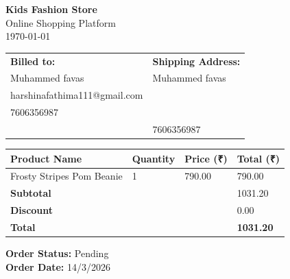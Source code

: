 \documentclass[a4paper,12pt]{article}
\begin{document}
            \begin{center}
            \textbf{\Large Kids Fashion Store}\\
            \small Online Shopping Platform\\ 
            \today
            \end{center}

            \vspace{1cm}

            \begin{tabular}{p{3cm} p{8cm}}
            \textbf{Billed to:} & \textbf{Shipping Address:} \\
            Muhammed favas & Muhammed favas \\
            harshinafathima111@gmail.com &  \\
            7606356987 &  \\
            & 7606356987 \\
            \end{tabular}

            \vspace{1cm}

            \begin{table}[h]
            \centering
            \begin{tabular}{p{4cm} p{2cm} p{2cm} p{2cm}}
            \toprule
            \rowcolor{lightgray} \textbf{Product Name} & \textbf{Quantity} & \textbf{Price (₹)} & \textbf{Total (₹)} \\
            \midrule
            
                Frosty Stripes Pom Beanie & 1 & 790.00 & 790.00 \\
            
            \midrule
            \rowcolor{lightgray} \textbf{Subtotal} & & & 1031.20 \\
            \rowcolor{lightgray} \textbf{Discount} & & & 0.00 \\
            \rowcolor{lightgray} \textbf{Total} & & & \textbf{1031.20} \\
            \bottomrule
            \end{tabular}
            \end{table}

            \vspace{1cm}

            \textbf{Order Status:} Pending\\
            \textbf{Order Date:} 14/3/2026

            
\end{document}

